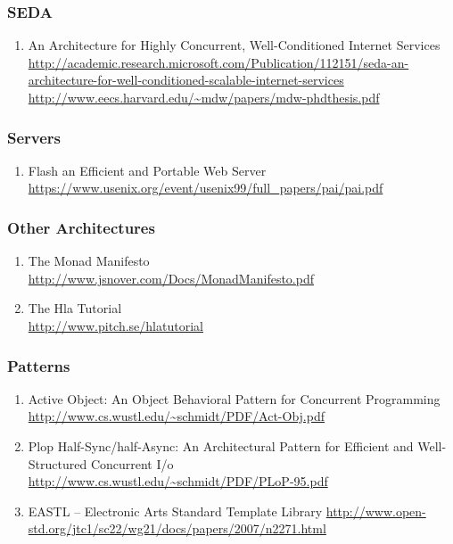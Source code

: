 \documentclass{article}
\begin{document}
\subsubsection{SEDA}
\begin{enumerate}
	\item {An Architecture for Highly Concurrent, Well-Conditioned Internet Services\\
\href{http://academic.research.microsoft.com/Publication/112151/seda-an-architecture-for-well-conditioned-scalable-internet-services}{http://academic.research.microsoft.com/Publication/112151/seda-an-architecture-for-well-conditioned-scalable-internet-services}\\
\url{http://www.eecs.harvard.edu/~mdw/papers/mdw-phdthesis.pdf}}
\end{enumerate}

\subsubsection{Servers}
\begin{enumerate}
	\item {Flash an Efficient and Portable Web Server\\
\url{https://www.usenix.org/event/usenix99/full_papers/pai/pai.pdf}}
\end{enumerate}

\subsubsection{Other Architectures}
\begin{enumerate}
	\item {The Monad Manifesto\\
\url{http://www.jsnover.com/Docs/MonadManifesto.pdf}}
	\item {The Hla Tutorial\\
\url{http://www.pitch.se/hlatutorial}}
\end{enumerate}

\subsubsection{Patterns}
\begin{enumerate}
	\item {Active Object: An Object Behavioral Pattern for Concurrent Programming\\
\url{http://www.cs.wustl.edu/~schmidt/PDF/Act-Obj.pdf}}
	\item {Plop Half-Sync/half-Async: An Architectural Pattern for Efficient and Well-Structured Concurrent I/o\\
\url{http://www.cs.wustl.edu/~schmidt/PDF/PLoP-95.pdf}}
	\item{EASTL -- Electronic Arts Standard Template Library \url{http://www.open-std.org/jtc1/sc22/wg21/docs/papers/2007/n2271.html}}
\end{enumerate}
\end{document}
